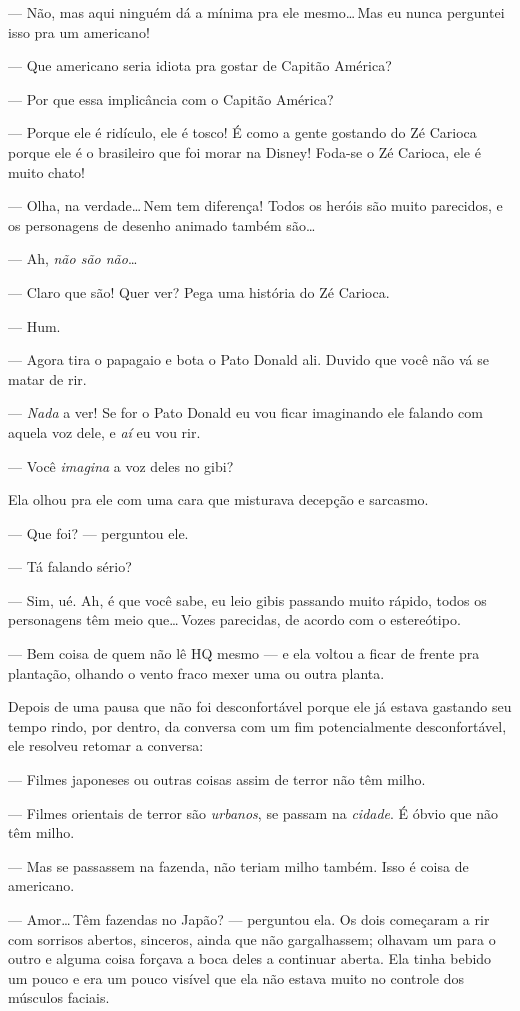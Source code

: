 --- Não, mas aqui ninguém dá a mínima pra ele mesmo\ldots\,Mas eu nunca perguntei isso pra um americano!

--- Que americano seria idiota pra gostar de Capitão América?

--- Por que essa implicância com o Capitão América?

--- Porque ele é ridículo, ele é tosco! É como a gente gostando do Zé Carioca porque ele é o brasileiro que foi morar na Disney! Foda-se o Zé Carioca, ele é muito chato!

--- Olha, na verdade\ldots\,Nem tem diferença! Todos os heróis são muito parecidos, e os personagens de desenho animado também são\ldots

--- Ah, \emph{não são não}\ldots

--- Claro que são! Quer ver? Pega uma história do Zé Carioca.

--- Hum.

--- Agora tira o papagaio e bota o Pato Donald ali. Duvido que você não vá se matar de rir.

--- \emph{Nada} a ver! Se for o Pato Donald eu vou ficar imaginando ele falando com aquela voz dele, e \emph{aí} eu vou rir.

--- Você \emph{imagina} a voz deles no gibi?

Ela olhou pra ele com uma cara que misturava decepção e sarcasmo.

--- Que foi? --- perguntou ele.

--- Tá falando sério?

--- Sim, ué. Ah, é que você sabe, eu leio gibis passando muito rápido, todos os personagens têm meio que\ldots\,Vozes parecidas, de acordo com o estereótipo.

--- Bem coisa de quem não lê HQ mesmo --- e ela voltou a ficar de frente pra plantação, olhando o vento fraco mexer uma ou outra planta.

Depois de uma pausa que não foi desconfortável porque ele já estava gastando seu tempo rindo, por dentro, da conversa com um fim potencialmente desconfortável, ele resolveu retomar a conversa:

--- Filmes japoneses ou outras coisas assim de terror não têm milho.

--- Filmes orientais de terror são \emph{urbanos}, se passam na \emph{cidade}. É óbvio que não têm milho.

--- Mas se passassem na fazenda, não teriam milho também. Isso é coisa de americano.

--- Amor\ldots\,Têm fazendas no Japão? --- perguntou ela. Os dois começaram a rir com sorrisos abertos, sinceros, ainda que não gargalhassem; olhavam um para o outro e alguma coisa forçava a boca deles a continuar aberta. Ela tinha bebido um pouco e era um pouco visível que ela não estava muito no controle dos músculos faciais.

